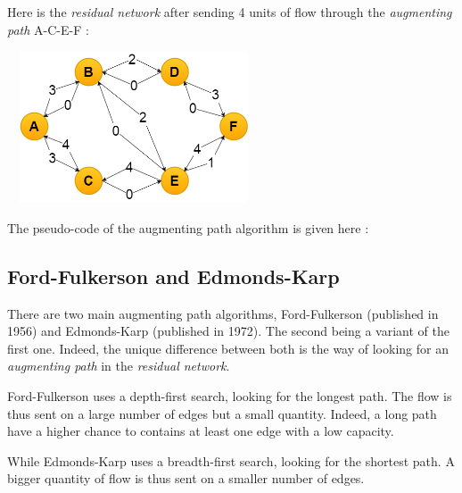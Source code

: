 Here is the \textit{residual network} after sending 4 units of flow through the \textit{augmenting path} A-C-E-F : \newline

\begin{center}
\includegraphics[width=7.5cm,height=4.5cm]{images/residualgraph2.png}
\end{center}

The pseudo-code of the augmenting path algorithm is given here :

\begin{algorithm}[h]

\end{algorithm}

\subsection{Ford-Fulkerson and Edmonds-Karp}
There are two main augmenting path algorithms, Ford-Fulkerson (published in 1956) and Edmonds-Karp (published in 1972). The second being a variant of the first one. Indeed, the unique difference between both is the way of looking for an \textit{augmenting path} in the \textit{residual network}. \newline

Ford-Fulkerson uses a depth-first search, looking for the longest path. The flow is thus sent on a large number of edges but a small quantity. Indeed, a long path have a higher chance to contains at least one edge with a low capacity. \newline

While Edmonds-Karp uses a breadth-first search, looking for the shortest path. A bigger quantity of flow is thus sent on a smaller number of edges. \newline



